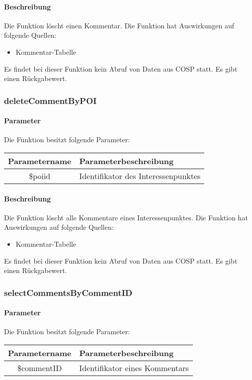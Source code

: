 \paragraph{Beschreibung} Die Funktion löscht einen Kommentar. Die Funktion hat Auswirkungen auf folgende Quellen:
\begin{itemize}
	\item Kommentar-Tabelle
\end{itemize}
Es findet bei dieser Funktion kein Abruf von Daten aus {\glqq COSP\grqq} statt. Es gibt einen Rückgabewert.
\subsubsection{deleteCommentByPOI}
\paragraph{Parameter} Die Funktion besitzt folgende Parameter:
\begin{table}[H]
	\begin{tabular}{|c|p{11cm}|}
		\hline
		\textbf{Parametername} & \textbf{Parameterbeschreibung} \\ \hline
		\$poiid & Identifikator des Interessenpunktes \\ \hline
	\end{tabular}
\end{table}
\paragraph{Beschreibung} Die Funktion löscht alle Kommentare eines Interessenpunktes. Die Funktion hat Auswirkungen auf folgende Quellen:
\begin{itemize}
	\item Kommentar-Tabelle
\end{itemize}
Es findet bei dieser Funktion kein Abruf von Daten aus {\glqq COSP\grqq} statt. Es gibt einen Rückgabewert.
\subsubsection{selectCommentsByCommentID}
\paragraph{Parameter} Die Funktion besitzt folgende Parameter:
\begin{table}[H]
	\begin{tabular}{|c|p{11cm}|}
		\hline
		\textbf{Parametername} & \textbf{Parameterbeschreibung} \\ \hline
		\$commentID & Identifikator eines Kommentars \\ \hline
	\end{tabular}
\end{table}
